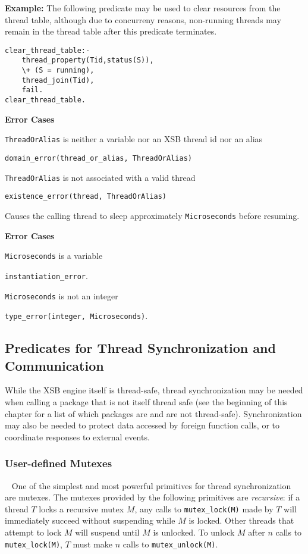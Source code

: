 \begin{description}
{\bf Example:} The following predicate may be used to clear resources
from the thread table, although due to concurreny reasons, non-running
threads may remain in the thread table after this predicate
terminates.
\begin{verbatim}
clear_thread_table:- 
    thread_property(Tid,status(S)),
    \+ (S = running),
    thread_join(Tid),
    fail.
clear_thread_table.
\end{verbatim}

{\bf Error Cases}
%
\bi
\item {\tt ThreadOrAlias} is neither a variable nor an XSB thread id
  nor an alias
\bi
\item {\tt domain\_error(thread\_or\_alias, ThreadOrAlias)}
\ei
\item {\tt ThreadOrAlias} is not associated with a valid thread
\bi
\item {\tt existence\_error(thread, ThreadOrAlias)}
\ei
\ei


%
Causes the calling thread to sleep approximately {\tt Microseconds}
before resuming.

{\bf Error Cases}
\bi
\item 	{\tt Microseconds} is a variable
\bi
\item 	{\tt instantiation\_error}.
\ei
\item 	{\tt Microseconds} is not an integer
\bi
\item 	{\tt type\_error(integer, Microseconds)}.
\ei
\ei



% 

\end{description}

\subsection{Predicates for Thread Synchronization and Communication} 
\label{sec:synchronization}

While the XSB engine itself is thread-safe, thread synchronization may
be needed when calling a package that is not itself thread safe (see
the beginning of this chapter for a list of which packages are and are
not thread-safe).  Synchronization may also be needed to protect data
accessed by foreign function calls, or to coordinate responses to
external events.

\subsubsection{User-defined Mutexes}~\label{sec:mutexes}
%
One of the simplest and most powerful primitives for thread
synchronization are mutexes.  The mutexes provided by the following
primitives are {\em recursive}: if a thread $T$ locks a recursive
mutex $M$, any calls to {\tt mutex\_lock(M)} made by $T$ will
immediately succeed without suspending while $M$ is locked.  Other
threads that attempt to lock $M$ will suspend until $M$ is unlocked.
To unlock $M$ after $n$ calls to {\tt mutex\_lock(M)}, $T$ must make
$n$ calls to {\tt mutex\_unlock(M)}.

